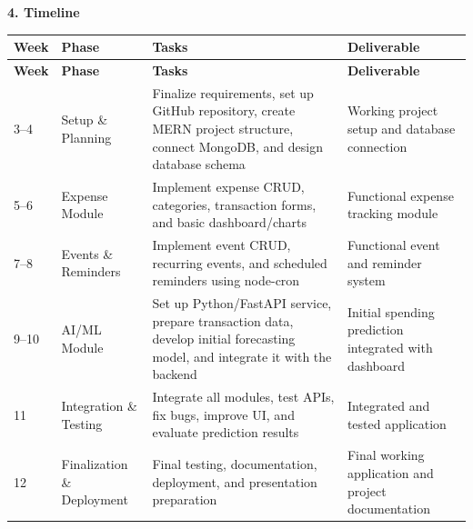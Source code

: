 \documentclass[12pt,a4paper]{article}\ref{}
\newcommand{\sectiontitle}[1]{%
    \vspace{8pt}
    \textbf{\large #1}
    \vspace{4pt}
}
\begin{document}
\vspace{5pt}


\newpage
\sectiontitle{4. Timeline}

\vspace{5pt}

\begin{center}
\renewcommand{\arraystretch}{1.35}

\begin{longtable}{
    >{\raggedright\arraybackslash}p{}
    >{\raggedright\arraybackslash}p{}
    >{\raggedright\arraybackslash}p{}
    >{\raggedright\arraybackslash}p{}
}

\toprule
\textbf{Week} &
\textbf{Phase} &
\textbf{Tasks} &
\textbf{Deliverable} \\
\midrule
\endfirsthead

\toprule
\textbf{Week} &
\textbf{Phase} &
\textbf{Tasks} &
\textbf{Deliverable} \\
\midrule
\endhead

3--4 &
Setup \& Planning &
Finalize requirements, set up GitHub repository, create MERN project structure,
connect MongoDB, and design database schema &
Working project setup and database connection \\

\midrule

5--6 &
Expense Module &
Implement expense CRUD, categories, transaction forms, and basic dashboard/charts &
Functional expense tracking module \\

\midrule

7--8 &
Events \& Reminders &
Implement event CRUD, recurring events, and scheduled reminders using node-cron &
Functional event and reminder system \\

\midrule

9--10 &
AI/ML Module &
Set up Python/FastAPI service, prepare transaction data, develop initial forecasting
model, and integrate it with the backend &
Initial spending prediction integrated with dashboard \\

\midrule

11 &
Integration \& Testing &
Integrate all modules, test APIs, fix bugs, improve UI, and evaluate prediction results &
Integrated and tested application \\

\midrule

12 &
Finalization \& Deployment &
Final testing, documentation, deployment, and presentation preparation &
Final working application and project documentation \\

\bottomrule
\end{longtable}
\end{center}
\end{document}
